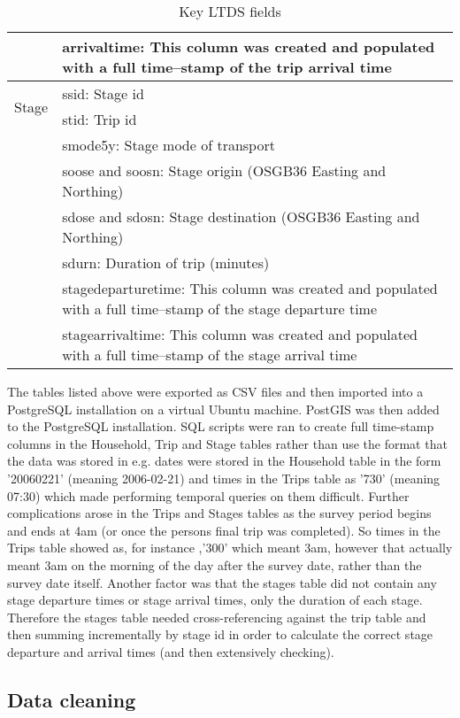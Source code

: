 \begin{center}
\begin{table}[h!]
\begin{tabular}{ | p{2.2cm} | p{12cm} |}
     & arrivaltime: This column was created and populated with a full time--stamp of the trip arrival time \\ \hline
    \multirow{2}{*}{Stage} & ssid: Stage id \\
     & stid: Trip id \\
     & smode5y: Stage mode of transport \\
     & soose and soosn: Stage origin (OSGB36 Easting and Northing) \\
     & sdose and sdosn: Stage destination (OSGB36 Easting and Northing) \\
     & sdurn: Duration of trip (minutes) \\
     & stagedeparturetime: This column was created and populated with a full time--stamp of the stage departure time \\
     & stagearrivaltime: This column was created and populated with a full time--stamp of the stage arrival time \\ \hline
    \end{tabular}
    \caption{Key LTDS fields}
    \label{tab:key_ltds_fields}
\end{table}
\end{center}

The tables listed above were exported as CSV files and then imported into a PostgreSQL installation on a virtual Ubuntu machine. PostGIS was then added to the PostgreSQL installation. SQL scripts were ran to create full time-stamp columns in the Household, Trip and Stage tables rather than use the format that the data was stored in e.g. dates were stored in the Household table in the form '20060221' (meaning 2006-02-21) and times in the Trips table as '730' (meaning 07:30) which made performing temporal queries on them difficult. Further complications arose in the Trips and Stages tables as the survey period begins and ends at 4am (or once the persons final trip was completed). So times in the Trips table showed as, for instance ,'300' which meant 3am, however that actually meant 3am on the morning of the day after the survey date, rather than the survey date itself. Another factor was that the stages table did not contain any stage departure times or stage arrival times, only the duration of each stage. Therefore the stages table needed cross-referencing against the trip table and then summing incrementally by stage id in order to calculate the correct stage departure and arrival times (and then extensively checking).

\subsection{Data cleaning}
\label{sec:reconstruction_data_cleaning}

